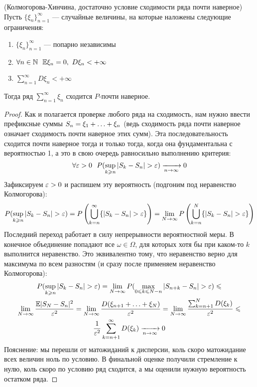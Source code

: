 \begin{theorem} (Колмогорова-Хинчина, достаточно условие сходимости ряда почти наверное)
	Пусть $\{\xi_n\}_{n = 1}^\infty$ --- случайные величины, на которые наложены следующие ограничения:
	\begin{enumerate}
		\item $\{\xi_n\}_{n = 1}^\infty$ --- попарно независимы
		
		\item $\forall n \in \N\ \ \E\xi_n = 0,\ D\xi_n < +\infty$
		
		\item $\sum_{n = 1}^\infty D\xi_n < +\infty$
	\end{enumerate}
	Тогда ряд $\sum_{n = 1}^\infty \xi_n$ сходится $P$-почти наверное.
\end{theorem}

\begin{proof}
	Как и полагается проверке любого ряда на сходимость, нам нужно ввести префиксные суммы $S_n = \xi_1 + \ldots + \xi_n$ (ведь сходимость ряда почти наверное означает сходимость почти наверное этих сумм). Эта последовательность сходится почти наверное тогда и только тогда, когда она фундаментальна с вероятностью 1, а это в свою очередь равносильно выполнению критерия:
	\[
		\forall \varepsilon > 0\ \ P(\sup_{k \geqslant n} |S_k - S_n| > \varepsilon) \xrightarrow[n \to \infty]{} 0
	\]
	Зафиксируем $\varepsilon > 0$ и распишем эту вероятность (подгоним под неравенство Колмогорова):
	\[
		P(\sup_{k \geqslant n} |S_k - S_n| > \varepsilon) = P\left(\bigcup_{k = n}^\infty \{|S_k - S_n| > \varepsilon\}\right) = \lim_{N \to \infty} P\left(\bigcup_{k = n}^N \{|S_k - S_n| > \varepsilon\}\right)
	\]
	Последний переход работает в силу непрерывности вероятностной меры. В конечное объединение попадают все $\omega \in \Omega$, для которых хотя бы при каком-то $k$ выполнится неравенство. Это эквивалентно тому, что неравенство верно для максимума по всем разностям (и сразу после применяем неравенство Колмогорова):
	\begin{multline*}
		P(\sup_{k \geqslant n} |S_k - S_n| > \varepsilon) = \lim_{N \to \infty} P(\max_{0 \leqslant k \leqslant N - n} |S_{n + k} - S_n| > \varepsilon) \leqslant
		\\
		\lim_{N \to \infty} \frac{\mathbb{E} |S_N - S_n|^2}{\varepsilon^2} = \lim_{N \to \infty} \frac{D(\xi_{n + 1} + \ldots + \xi_N)}{\varepsilon^2} = \lim_{N \to \infty} \frac{\sum_{k = n + 1}^N D(\xi_k)}{\varepsilon^2} \leqslant
		\\
		\frac{1}{\varepsilon^2} \sum_{k = n + 1}^\infty D(\xi_k) \xrightarrow[n \to \infty]{} 0
	\end{multline*}
	Пояснение: мы перешли от матожиданий к дисперсии, коль скоро матожидание всех величин ноль по условию. В финальной оценке получили стремление к нулю, коль скоро по условию ряд сходится, а мы оценили нужную вероятность остатком ряда.
\end{proof}

